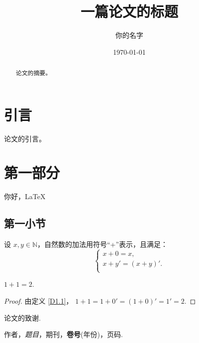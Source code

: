 



\title{一篇论文的标题}
\author{你的名字}
\date{\today}
\maketitle

\begin{abstract}
	论文的摘要。
\end{abstract}

\setcounter{section}{-1}
\section{引言}
论文的引言。

\section{第一部分}	
	你好，\LaTeX

\subsection{第一小节}

\begin{defn}\label{D1.1}
	设 $ x,y \in \mathbb{N} $，自然数的加法用符号“+”表示，且满足：
	\[ \left\{ \begin{array}{l}
		x+0 = x, \\
		x+y' = (x+y)'. \\
	\end{array} \right. \]
\end{defn}

\begin{thm}[定理名]
	$ 1+1 = 2 $.
\end{thm}

\begin{proof}
	由定义 \ref{D1.1}，
	$ 1+1 = 1+0' = (1+0)' = 1' = 2 $.
\end{proof}

\begin{ack}
	论文的致谢.
\end{ack}


\begin{thebibliography}{60}
	 作者，\emph{题目}，期刊，\textbf{卷号}(年份)，页码.
\end{thebibliography}	


